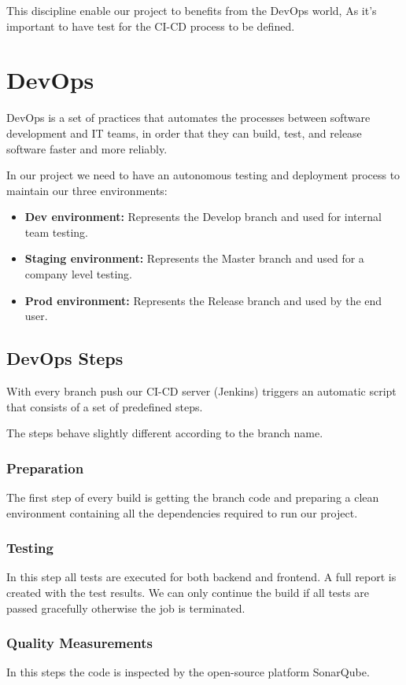 \begin{spacing}{1.2}
This discipline enable our project to benefits from the DevOps world, As it's important to have test for the CI-CD process to be defined.


\section{DevOps}
DevOps is a set of practices that automates the processes between software development and IT teams, in order that they can build, test, and release software faster and more reliably.

In our project we need to have an autonomous testing and deployment process to maintain our three environments:
\begin{itemize}
	\item \textbf{Dev environment:} Represents the Develop branch and used for internal team testing.
	\item \textbf{Staging environment:} Represents the Master branch and used for a company level testing.
    \item \textbf{Prod environment:} Represents the Release branch and used by the end user.
\end{itemize}

\subsection{DevOps Steps}
With every branch push our CI-CD server (Jenkins) triggers an automatic script that consists of a set of predefined steps.

The steps behave slightly different according to the branch name.
\subsubsection{Preparation}
The first step of every build is getting the branch code and preparing a clean environment containing all the dependencies required to run our project.
\subsubsection{Testing}
In this step all tests are executed for both backend and frontend. A full report is created with the test results.
We can only continue the build if all tests are passed gracefully otherwise the job is terminated.
\subsubsection{Quality Measurements}
In this steps the code is inspected by the open-source platform SonarQube.


\end{spacing}
